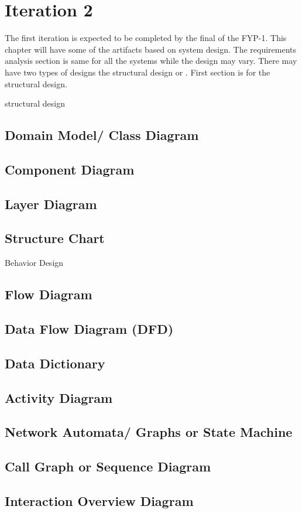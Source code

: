 \chapter{Iteration 2}
\label{ch:iter2}

The first iteration is expected to be completed by the final of the FYP-1.
This chapter will have some of the artifacts based on system design. The requirements analysis section is same for all the systems while the design may vary. There may have two types of designs the structural design or . First section is for the structural design.

structural design
\section{Domain Model/ Class Diagram}
\section{Component Diagram}
\section{Layer Diagram}
\section{Structure Chart}
Behavior Design
\section{Flow Diagram}
\section{Data Flow Diagram (DFD)}
\section{Data Dictionary}
\section{Activity Diagram}
\section{Network Automata/ Graphs or State Machine}
\section{Call Graph or Sequence Diagram}
\section{Interaction Overview Diagram}

